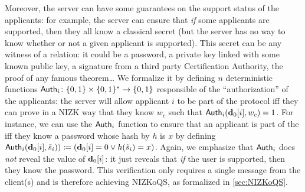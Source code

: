 Moreover, the server can have some guarantees on the support status of the applicants: for example, the server can ensure that \emph{if} some applicants are supported, then they all know a classical secret (but the server has no way to know whether or not a given applicant is supported). This secret can be any witness of a \npol{} relation: it could be a password, a private key linked with some known public key, a signature from a third party Certification Authority, the proof of any famous theorem\dots{} We formalize it by defining $n$ deterministic functions ${\sf Auth}_i\colon \{0,1\} \times \{0,1\}^* \rightarrow \{0,1\}$ responsible of the ``authorization'' of the applicants: the server will allow applicant $i$ to be part of the protocol iff they can prove in a NIZK way that they know $w_c$ such that ${\sf Auth}_i(\mathbf{d}_0[i],w_c)=1$. For instance, we can use the ${\sf Auth}_i$ function to ensure that an applicant is part of the \GHZ{} iff they know a password whose hash by $h$ is $x$ by defining ${\sf Auth}_i(\mathbf{d}_0[i],\tilde{s}_i)) \coloneqq (\mathbf{d}_0[i] = 0 \lor h(\tilde{s}_i) = x)$. Again, we emphasize that ${\sf Auth}_i$ does \emph{not} reveal the value of $\mathbf{d}_0[i]$: it just reveals that \emph{if} the user is supported, then they know the password. This verification only requires a single message from the client(s) and is therefore achieving NIZKoQS, as formalized in \cref{sec:NIZKoQS}.


